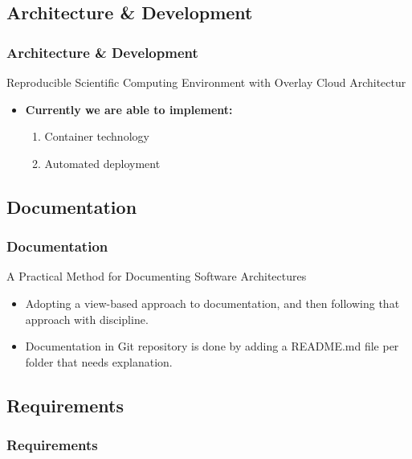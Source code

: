 \documentclass[12pt]{beamer}
\begin{document}
    \subsection{Architecture \& Development}
    \begin{frame}
        \frametitle{Architecture \& Development}
        Reproducible Scientific Computing Environment with Overlay Cloud Architectur
        \begin{itemize}
            \item<1->\textbf{Currently we are able to implement:}
            \begin{enumerate}    
                \item<2-> Container technology
                \item<3-> Automated deployment
            \end{enumerate}
        \end{itemize}
    \end{frame}

    \subsection{Documentation}
    \begin{frame}
        \frametitle{Documentation}
        A Practical Method for Documenting Software Architectures
    \begin{itemize}
        \item Adopting a view-based approach to documentation,
        and then following that approach with discipline.
        \item Documentation in Git repository is done by adding a README.md file
        per folder that needs explanation.
    \end{itemize}
    \end{frame}

    \subsection{Requirements}
    \begin{frame}
        \frametitle{Requirements}
    \end{frame}
\end{document}
